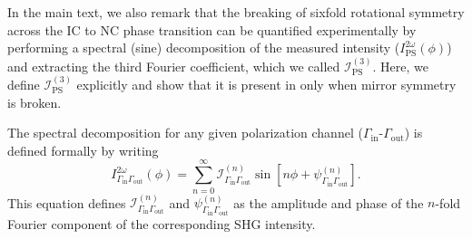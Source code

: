 In the main text, we also remark that the breaking of sixfold rotational symmetry across the IC to NC phase transition can be quantified experimentally by performing a spectral (sine) decomposition of the measured intensity ($I_\mathrm{PS}^{2\omega}(\phi)$) and extracting the third Fourier coefficient, which we called $\mathscr{I}_\mathrm{PS}^{(3)}$.
Here, we define $\mathscr{I}_\mathrm{PS}^{(3)}$ explicitly and show that it is present in \tastwo only when mirror symmetry is broken.

The spectral decomposition for any given polarization channel ($\Gamma_\mathrm{in}$-$\Gamma_\mathrm{out}$) is defined formally by writing
\begin{equation}
\label{eq:fourierdecomposition}
I_{\Gamma_\mathrm{in}\Gamma_\mathrm{out}}^{2\omega}(\phi) = \sum_{n=0}^{\infty} \mathscr{I}_{\Gamma_\mathrm{in}\Gamma_\mathrm{out}}^{(n)} \sin{\left[n\phi + \psi_{\Gamma_\mathrm{in}\Gamma_\mathrm{out}}^{(n)}\right]}.
\end{equation}
This equation defines $\mathscr{I}_{\Gamma_\mathrm{in}\Gamma_\mathrm{out}}^{(n)}$ and $\psi_{\Gamma_\mathrm{in}\Gamma_\mathrm{out}}^{(n)}$ as the amplitude and phase of the $n$-fold Fourier component of the corresponding SHG intensity. 

